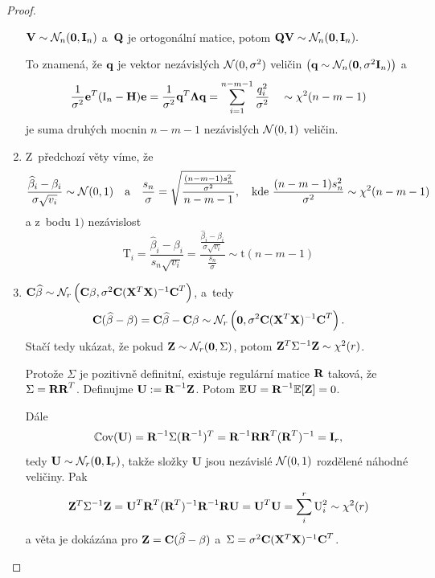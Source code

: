 \begin{proof}
\begin{enumerate}
\begin{theorem}
	 $\textbf{V} \sim \mathcal{N}_n (\boldsymbol{0}, \textbf{I}_{n})$ a~$\textbf{Q}$ je ortogonální matice, potom $\textbf{Q} \textbf{V} \sim \mathcal{N}_n (\boldsymbol{0}, \textbf{I}_{n}).$
\end{theorem}
\vspace{0.1cm}
To znamená, že $\textbf{q}$ je vektor nezávislých $\mathcal{N}(0,\sigma^2)$ veličin $\left(\textbf{q} \sim \mathcal{N}_n (\boldsymbol{0}, \sigma^2 \textbf{I}_{n})\right)$ a
 $$ \frac{1}{\sigma^2} \mathbf{e}^T (\text{I}_n - \textbf{H}) \mathbf{e} = \frac{1}{\sigma^2} \textbf{q}^T \mathbf{\Lambda} \textbf{q} = \sum_{i = 1}^{n-m-1}\frac{q_i^2}{\sigma^2} \quad \sim \chi^2 (n - m - 1) $$
je suma druhých mocnin $n-m-1$ nezávislých $\mathcal{N}(0,1)$ veličin.
\item Z~předchozí věty víme, že
 $$
  \frac{\widehat{\beta}_i - \beta_i}{\sigma \sqrt{v_i}} \sim \mathcal{N}(0,1) \quad \text{a} \quad \frac{s_n}{\sigma} = \sqrt{\frac{\frac{(n-m-1) s_n^2}{\sigma^2}}{n-m-1}},\quad\text{kde }  \frac{(n-m-1) s_n^2}{\sigma^2}\sim \chi^2(n-m-1)
 $$
a z~bodu $1)$ nezávislost
\begin{equation}
  \text{T}_i = \frac{\widehat{\beta}_i - \beta_i}{s_n \sqrt{v_i}} = \frac{\frac{\widehat{\beta}_i - \beta_i}{\sigma \sqrt{v_i}}}{\frac{s_n}{\sigma}} \sim \mathrm{t}(n-m-1)
\label{Rozdeleni_T}
\end{equation}
\item
 $\textbf{C} \widehat{\beta} \sim \mathcal{N}_r \left(\textbf{C} \beta, \sigma^2 \textbf{C} (\mathbf{X}^T \mathbf{X})^{-1} \textbf{C}^T \right)$, a~tedy
 $$ \textbf{C} (\widehat{\beta} - \beta) = \textbf{C}\widehat{\beta} - \textbf{C} \beta \sim \mathcal{N}_r \left(\boldsymbol{0}, \sigma^2 \textbf{C} (\mathbf{X}^T \mathbf{X})^{-1} \textbf{C}^T\right). $$
Stačí tedy ukázat, že pokud $\mathbf{Z} \sim \mathcal{N}_r (\boldsymbol{0}, \Sigma)$, potom $\mathbf{Z}^T {\Sigma^{-1}} \mathbf{Z} \sim \chi^2(r)$.

Protože $\Sigma$ je pozitivně definitní, existuje regulární matice $\textbf{R}$ taková, že $\Sigma = \textbf{R}\textbf{R}^T$. Definujme $\textbf{U} := \textbf{R}^{-1} \mathbf{Z}$. Potom $\mathbb{E} \textbf{U} = \textbf{R}^{-1} \mathbb{E} [\mathbf{Z}] = 0$.

Dále
$$\mathbb{C}\mathrm{ov}(\textbf{U}) = \textbf{R}^{-1} \Sigma (\textbf{R}^{-1})^T = \textbf{R}^{-1} \textbf{R}\textbf{R}^T (\textbf{R}^T)^{-1} = \textbf{I}_r,$$
 tedy $\textbf{U} \sim \mathcal{N}_r (\boldsymbol{0}, \textbf{I}_r)$, takže složky \textbf{U} jsou nezávislé $\mathcal{N}(0,1)$ rozdělené náhodné veličiny. Pak
 $$ \mathbf{Z}^T \Sigma^{-1} \mathbf{Z} = \textbf{U}^T \textbf{R}^T (\textbf{R}^T)^{-1} \textbf{R}^{-1} \textbf{R} \textbf{U} = \textbf{U}^T \textbf{U} = \sum_i^r \text{U}_i^2 \sim \chi^2(r) $$
a věta je dokázána pro $\mathbf{Z} = \textbf{C} (\widehat{\beta} - \beta)$ a~$\Sigma = \sigma^2 \textbf{C} (\mathbf{X}^T \mathbf{X})^{-1} \textbf{C}^T$.

\end{enumerate}
\end{proof}

